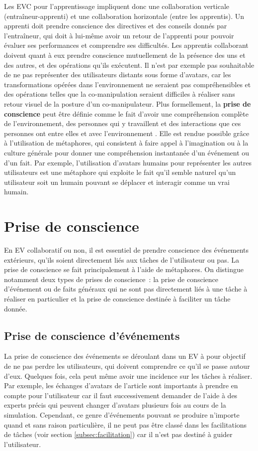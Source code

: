 \documentclass[11pt]{article}
\begin{document}
Les EVC pour l'apprentissage impliquent donc une collaboration verticale (entraîneur-apprenti) et une collaboration horizontale (entre les apprentis). Un apprenti doit prendre conscience des directives et des conseils donnés par l'entraîneur, qui doit à lui-même avoir un retour de l'apprenti pour pouvoir évaluer ses performances et comprendre ses difficultés. Les apprentis collaborant doivent quant à eux prendre conscience mutuellement de la présence des uns et des autres, et des opérations qu'ils exécutent. Il n'est par exemple pas souhaitable de ne pas représenter des utilisateurs distants sous forme d'avatars, car les transformations opérées dans l'environnement ne seraient pas compréhensibles et des opérations telles que la co-manipulation seraient difficiles à réaliser sans retour visuel de la posture d'un co-manipulateur. Plus formellement, la \textbf{prise de conscience} peut être définie comme le fait d'avoir une compréhension complète de l'environnement, des personnes qui y travaillent et des interactions que ces personnes ont entre elles et avec l'environnement \cite{survey}. Elle est rendue possible grâce à l'utilisation de métaphores, qui consistent à faire appel à l'imagination ou à la culture générale pour donner une compréhension instantanée d'un événement ou d'un fait. Par exemple, l'utilisation d'avatars humains pour représenter les autres utilisateurs est une métaphore qui exploite le fait qu'il semble naturel qu'un utilisateur soit un humain pouvant se déplacer et interagir comme un vrai humain.

\section{Prise de conscience}

En EV collaboratif ou non, il est essentiel de prendre conscience des événements extérieurs, qu'ils soient directement liés aux tâches de l'utilisateur ou pas. La prise de conscience se fait principalement à l'aide de métaphores. On distingue notamment deux types de prises de conscience~: la prise de conscience d'événement ou de faits généraux qui ne sont pas directement liés à une tâche à réaliser en particulier et la prise de conscience destinée à faciliter un tâche donnée.

\subsection{Prise de conscience d'événements}
La prise de conscience des événements se déroulant dans un EV à pour objectif de ne pas perdre les utilisateurs, qui doivent comprendre ce qu'il se passe autour d'eux. Quelques fois, cela peut même avoir une incidence sur les tâches à réaliser. Par exemple, les échanges d'avatars de l'article \cite{avatars} sont importants à prendre en compte pour l'utilisateur car il faut successivement demander de l'aide à des experts précis qui peuvent changer d'avatars plusieurs fois au cours de la simulation. Cependant, ce genre d'événements pouvant se produire n'importe quand et sans raison particulière, il ne peut pas être classé dans les facilitations de tâches (voir section \ref{subsec:facilitation}) car il n'est pas destiné à guider l'utilisateur.
\\
\end{document}
